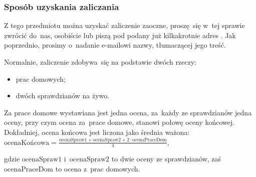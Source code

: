 \documentclass[10pt,t]{beamer}
\begin{document}
\begin{frame}
  \frametitle{Sposób uzyskania zaliczania}


  Z tego przedmiotu można uzyskać zaliczenie zaoczne, proszę~się w~tej
  sprawie zwrócić do~nas, osobiście lub piszą pod podany już kilkakrotnie
  adres \email. Jak poprzednio, prosimy o~nadanie e-mailowi nazwy,
  tłumaczącej jego treść.

  Normalnie, zaliczenie zdobywa~się na podstawie dwóch rzeczy:

  \vspace{-0.3em}



  \begin{itemize}

  \item prac domowych;

  \item dwóch sprawdzianów na żywo.

  \end{itemize}

  \vspace{-0.3em}



  Za prace domowe wystawiana jest jedna ocena, za~każdy ze sprawdzianów
  jedna oceny, przy czym ocena za~prace domowe, stanowi \alert{połowę}
  oceny końcowej. Dokładniej, ocena końcowa jest liczona jako średnia
  ważona: \\[0.3em]
  $\displaystyle
  \text{ocenaKońcowa} =
  \frac{ \text{ocenaSpraw1} + \text{ocenaSpraw2} +
    2 \cdot \text{ocenaPraceDom} }{ 4 }$,

  \vspace{0.5em}


  gdzie $\text{ocenaSpraw1}$ i~$\text{ocenaSpraw2}$ to dwie oceny ze
  sprawdzianów, zaś $\text{ocenaPraceDom}$ to ocena z~prac domowych.



\end{frame}
\end{document}
